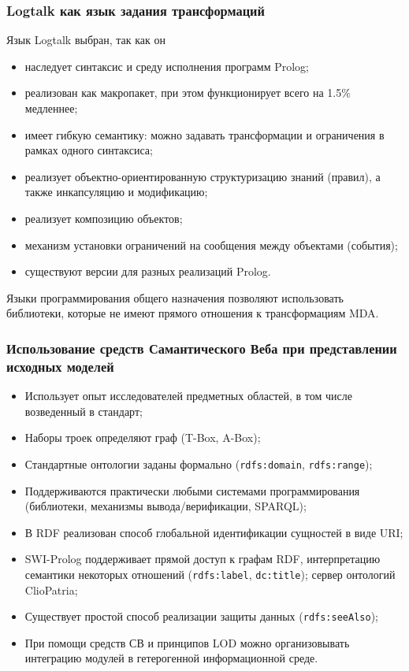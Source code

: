 \documentclass[10pt]{beamer}
\begin{document}
\begin{frame} \frametitle{Logtalk как язык задания трансформаций} Язык Logtalk выбран, так как он \begin{itemize} \item наследует синтаксис и среду исполнения программ Prolog; \item реализован как макропакет, при этом функционирует всего на 1.5\% медленнее; \item имеет гибкую семантику: можно задавать трансформации и ограничения в рамках одного синтаксиса; \item реализует объектно-ориентированную структуризацию знаний (правил), а также инкапсуляцию и модификацию; \item реализует композицию объектов; \item механизм установки ограничений на сообщения между объектами (события); \item существуют версии для разных реализаций Prolog. \end{itemize} Языки программирования общего назначения позволяют использовать библиотеки, которые не имеют прямого отношения к трансформациям MDA.
\end{frame}

\begin{frame}[fragile]
  \frametitle{Использование средств Самантического Веба при представлении исходных моделей}
  \begin{itemize}
  \item Использует опыт исследователей предметных областей, в том числе возведенный в стандарт;
  \item Наборы троек определяют граф (T-Box, A-Box);
  \item Стандартные онтологии заданы формально (\verb|rdfs:domain|, \verb|rdfs:range|);
  \item Поддерживаются практически любыми системами программирования (библиотеки, механизмы вывода/верификации, SPARQL);
  \item В RDF реализован способ глобальной идентификации сущностей в виде URI;%
  \item SWI-Prolog поддерживает прямой доступ к графам RDF, интерпретацию семантики некоторых отношений (\verb|rdfs:label|, \verb|dc:title|); сервер онтологий ClioPatria;
  \item Существует простой способ реализации защиты данных (\verb|rdfs:seeAlso|);
  \item При помощи средств СВ и принципов LOD можно организовывать интеграцию модулей в гетерогенной информационной среде.
  \end{itemize}
\end{frame}
\end{document}
